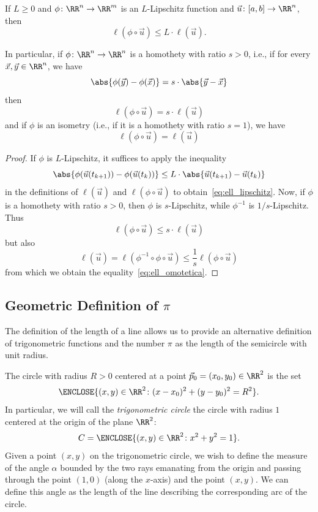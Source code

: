 \begin{lemma}
If $L\ge 0$ and $\phi\colon \RR^n \to \RR^m$ is an $L$-Lipschitz function and
$\vec u\colon [a,b]\to \RR^n$, then
\begin{equation}\label{eq:ell_lipschitz}
  \ell(\phi\circ \vec u) \le L \cdot \ell(\vec u).  
\end{equation}

In particular, if $\phi\colon\RR^n\to\RR^n$ is a homothety with ratio $s> 0$,
i.e., if for every $\vec x, \vec y \in \RR^n$, we have
\[
   \abs{\phi(\vec y) - \phi(\vec x)} = s \cdot \abs{\vec y - \vec x}
\]
then 
\begin{equation}\label{eq:ell_omotetica}
  \ell(\phi\circ \vec u) = s\cdot \ell(\vec u)  
\end{equation}
and if $\phi$ is an isometry (i.e., if it is a homothety with ratio $s=1$), we
have
\begin{equation}\label{eq:ell_isometrica}
  \ell(\phi\circ \vec u) = \ell(\vec u)  
\end{equation}
\end{lemma}
\begin{proof}
If $\phi$ is $L$-Lipschitz, it suffices to apply the inequality
\[
  \abs{\phi(\vec u(t_{k+1})) - \phi(\vec u(t_k))}
  \le L\cdot \abs{\vec u(t_{k+1}) - \vec u(t_k)}  
\]
in the definitions of $\ell(\vec u)$ and $\ell(\phi\circ \vec u)$ to
obtain~\eqref{eq:ell_lipschitz}.
Now, if $\phi$ is a homothety with ratio $s>0$, then $\phi$ is $s$-Lipschitz,
while $\phi^{-1}$ is $1/s$-Lipschitz. Thus
\[
   \ell(\phi\circ \vec u) \le s\cdot \ell(\vec u)
\]
but also  
\[
  \ell(\vec u) = \ell(\phi^{-1}\circ \phi \circ \vec u)
  \le \frac 1 s \ell(\phi\circ \vec u)
\]
from which we obtain the equality~\eqref{eq:ell_omotetica}.
\end{proof}

\subsection{Geometric Definition of $\pi$}

The definition of the length of a line allows us to provide an alternative
definition of trigonometric functions and the number $\pi$ as the length of the
semicircle with unit radius.

The circle with radius $R>0$ centered at a point $\vec p_0 = (x_0,y_0)\in \RR^2$
is the set
\[
 \ENCLOSE{(x,y) \in \RR^2\colon (x-x_0)^2 + (y-y_0)^2 = R^2}.  
\]
In particular, we will call the \emph{trigonometric circle} the circle with
radius $1$ centered at the origin of the plane $\RR^2$:
\[
 C = \ENCLOSE{(x,y)\in \RR^2 \colon x^2 + y^2 = 1}.  
\]
Given a point $(x,y)$ on the trigonometric circle, we wish to define the measure
of the angle $\alpha$ bounded by the two rays emanating from the origin and
passing through the point $(1,0)$ (along the $x$-axis) and the point $(x,y)$. We
can define this angle as the length of the line describing the corresponding arc
of the circle.

